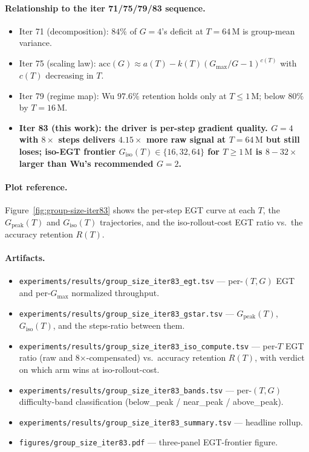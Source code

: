 \paragraph{Relationship to the iter 71/75/79/83 sequence.}
\begin{itemize}
  \item Iter 71 (decomposition): $84\%$ of $G{=}4$'s deficit at
        $T{=}64\,\mathrm{M}$ is group-mean variance.
  \item Iter 75 (scaling law): $\mathrm{acc}(G) \approx
        a(T) - k(T)(G_{\mathrm{max}}/G - 1)^{c(T)}$ with
        $c(T)$ decreasing in $T$.
  \item Iter 79 (regime map): Wu $97.6\%$ retention holds only at
        $T \le 1\,\mathrm{M}$; below $80\%$ by $T{=}16\,\mathrm{M}$.
  \item \textbf{Iter 83 (this work): the driver is per-step gradient
        quality.  $G{=}4$ with $8{\times}$ steps delivers
        $4.15{\times}$ more raw signal at $T{=}64\,\mathrm{M}$ but
        still loses; iso-EGT frontier $G_{\mathrm{iso}}(T) \in
        \{16, 32, 64\}$ for $T \ge 1\,\mathrm{M}$ is $8{-}32{\times}$
        larger than Wu's recommended $G{=}2$.}
\end{itemize}

\paragraph{Plot reference.}
Figure~\ref{fig:group-size-iter83} shows the per-step EGT curve at
each $T$, the $G_{\mathrm{peak}}(T)$ and $G_{\mathrm{iso}}(T)$
trajectories, and the iso-rollout-cost EGT ratio vs.\ the accuracy
retention $R(T)$.

\paragraph{Artifacts.}
\begin{itemize}
  \item \texttt{experiments/results/group\_size\_iter83\_egt.tsv} ---
        per-$(T, G)$ EGT and per-$G_{\max}$ normalized throughput.
  \item \texttt{experiments/results/group\_size\_iter83\_gstar.tsv} ---
        $G_{\mathrm{peak}}(T)$, $G_{\mathrm{iso}}(T)$, and the
        steps-ratio between them.
  \item \texttt{experiments/results/group\_size\_iter83\_iso\_compute.tsv} ---
        per-$T$ EGT ratio (raw and 8$\times$-compensated) vs.\ accuracy
        retention $R(T)$, with verdict on which arm wins at
        iso-rollout-cost.
  \item \texttt{experiments/results/group\_size\_iter83\_bands.tsv} ---
        per-$(T, G)$ difficulty-band classification
        (below\_peak / near\_peak / above\_peak).
  \item \texttt{experiments/results/group\_size\_iter83\_summary.tsv} ---
        headline rollup.
  \item \texttt{figures/group\_size\_iter83.pdf} ---
        three-panel EGT-frontier figure.
\end{itemize}

